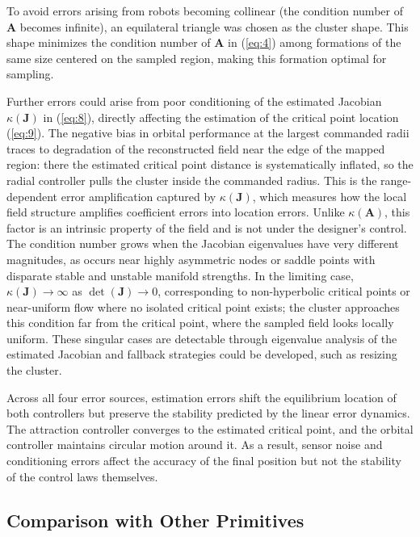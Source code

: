 \documentclass[lettersize,journal]{IEEEtran}
\begin{document}
To avoid errors arising from robots becoming collinear (the condition number of $\mathbf{A}$ becomes infinite), an equilateral triangle was chosen as the cluster shape. This shape minimizes the condition number of $\mathbf{A}$ in (\ref{eq:4}) among formations of the same size centered on the sampled region, making this formation optimal for sampling.

Further errors could arise from poor conditioning of the estimated Jacobian $\kappa(\mathbf{J})$ in (\ref{eq:8}), directly affecting the estimation of the critical point location (\ref{eq:9}). The negative bias in orbital performance at the largest commanded radii traces to degradation of the reconstructed field near the edge of the mapped region: there the estimated critical point distance is systematically inflated, so the radial controller pulls the cluster inside the commanded radius. This is the range-dependent error amplification captured by $\kappa(\mathbf{J})$, which measures how the local field structure amplifies coefficient errors into location errors. Unlike $\kappa(\mathbf{A})$, this factor is an intrinsic property of the field and is not under the designer's control. The condition number grows when the Jacobian eigenvalues have very different magnitudes, as occurs near highly asymmetric nodes or saddle points with disparate stable and unstable manifold strengths. In the limiting case, $\kappa(\mathbf{J}) \to \infty$ as $\det(\mathbf{J}) \to 0$, corresponding to non-hyperbolic critical points or near-uniform flow where no isolated critical point exists; the cluster approaches this condition far from the critical point, where the sampled field looks locally uniform. These singular cases are detectable through eigenvalue analysis of the estimated Jacobian and fallback strategies could be developed, such as resizing the cluster.

Across all four error sources, estimation errors shift the equilibrium location of both controllers but preserve the stability predicted by the linear error dynamics. The attraction controller converges to the estimated critical point, and the orbital controller maintains circular motion around it. As a result, sensor noise and conditioning errors affect the accuracy of the final position but not the stability of the control laws themselves.

\subsection{Comparison with Other Primitives}
\end{document}
